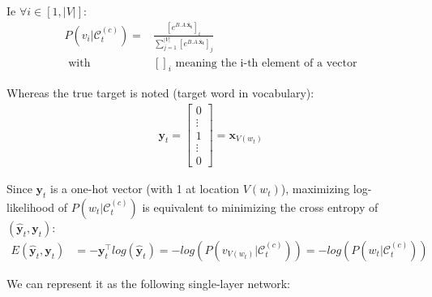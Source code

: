 Ie $\forall i \in [1, |V|]$:
\begin{align}
 P(v_i | \mathcal{C}_t^{(c)})= 
 	&\frac{  [e^{B.A.\mathbf{\bar x_t}}]_i}
 	{\sum_{j=1}^{|V|} [e^{B.A.\mathbf{\bar x_t}} ]_j} \\
 	\text{      with}& []_i \text{ meaning the i-th element of a vector}
\end{align}


Whereas the true target is noted (target word in vocabulary):
\begin{align}
 \mathbf{y}_t = 
	\begin{bmatrix} 
		0 \\
		\vdots \\
		1 \\
		\vdots \\
		0
	\end{bmatrix} 
	= \mathbf{x}_{V(w_t)}
\end{align}


Since $\mathbf{y}_t$ is a one-hot vector (with 1 at location $V(w_t)$), maximizing log-likelihood of $P(w_t | \mathcal{C}_t^{(c)})$ is equivalent to minimizing the cross entropy of $(\mathbf{\hat y}_t, \mathbf{y}_t)$:
\begin{align}
E(\mathbf{\hat y}_t, \mathbf{y}_t) &= - \mathbf{y}_t^{\top} log(\mathbf{\hat y}_t) = - log(P(v_{V(w_t)} | \mathcal{C}_t^{(c)})) =- log(P(w_t | \mathcal{C}_t^{(c)}))
\end{align}

We can represent it as the following single-layer network:

